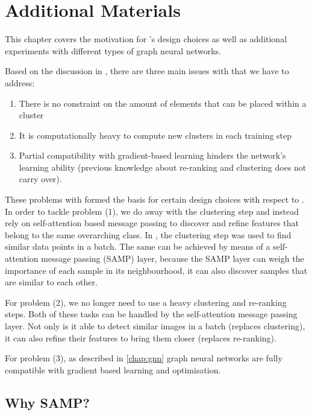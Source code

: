 \chapter{\samptr{} Additional Materials}\label{sec:samptr-additional-mat}

This chapter covers the motivation for \samptr{}'s design choices as well as additional experiments with different types of graph neural networks.

Based on the discussion in , there are three main issues with \ccclr{} that we have to address:
\begin{enumerate}
    \item There is no constraint on the amount of elements that can be placed within a cluster
    \item It is computationally heavy to compute new clusters in each training step 
    \item Partial compatibility with gradient-based learning hinders the network's learning ability (previous knowledge about re-ranking and clustering does not carry over).
\end{enumerate}

These problems with \ccclr{} formed the basis for certain design choices with respect to \samptr{}. In order to tackle problem (1), we do away with the clustering step and instead rely on self-attention based message passing to discover and refine features that belong to the same overarching class. In \ccclr{}, the clustering step was used to find similar data points in a batch. The same can be achieved by means of a self-attention message passing (SAMP) layer, because the SAMP layer can weigh the importance of each sample in its neighbourhood, it can also discover samples that are similar to each other.

For problem (2), we no longer need to use a heavy clustering and re-ranking steps. Both of these tasks can be handled by the self-attention message passing layer. Not only is it able to detect similar images in a batch (replaces clustering), it can also refine their features to bring them closer (replaces re-ranking).

For problem (3), as described in \cref{chap:gnn} graph neural networks are fully compatible with gradient based learning and optimisation. 


\section{Why SAMP?}\label{sec:why-samp}

